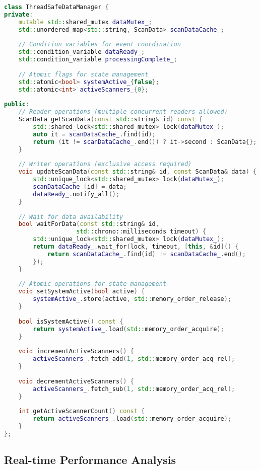 \begin{lstlisting}[language=C++, caption=Thread-Safe Data Management]
class ThreadSafeDataManager {
private:
    mutable std::shared_mutex dataMutex_;
    std::unordered_map<std::string, ScanData> scanDataCache_;
    
    // Condition variables for event coordination
    std::condition_variable dataReady_;
    std::condition_variable processingComplete_;
    
    // Atomic flags for state management
    std::atomic<bool> systemActive_{false};
    std::atomic<int> activeScanners_{0};
    
public:
    // Reader operations (multiple concurrent readers allowed)
    ScanData getScanData(const std::string& id) const {
        std::shared_lock<std::shared_mutex> lock(dataMutex_);
        auto it = scanDataCache_.find(id);
        return (it != scanDataCache_.end()) ? it->second : ScanData{};
    }
    
    // Writer operations (exclusive access required)
    void updateScanData(const std::string& id, const ScanData& data) {
        std::unique_lock<std::shared_mutex> lock(dataMutex_);
        scanDataCache_[id] = data;
        dataReady_.notify_all();
    }
    
    // Wait for data availability
    bool waitForData(const std::string& id, 
                    std::chrono::milliseconds timeout) {
        std::unique_lock<std::shared_mutex> lock(dataMutex_);
        return dataReady_.wait_for(lock, timeout, [this, &id]() {
            return scanDataCache_.find(id) != scanDataCache_.end();
        });
    }
    
    // Atomic operations for state management
    void setSystemActive(bool active) {
        systemActive_.store(active, std::memory_order_release);
    }
    
    bool isSystemActive() const {
        return systemActive_.load(std::memory_order_acquire);
    }
    
    void incrementActiveScanners() {
        activeScanners_.fetch_add(1, std::memory_order_acq_rel);
    }
    
    void decrementActiveScanners() {
        activeScanners_.fetch_sub(1, std::memory_order_acq_rel);
    }
    
    int getActiveScannerCount() const {
        return activeScanners_.load(std::memory_order_acquire);
    }
};
\end{lstlisting}

\subsection{Real-time Performance Analysis}
\label{subsec:realtime_performance}

